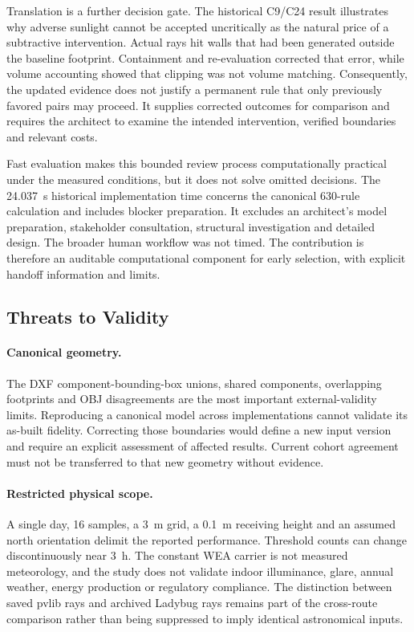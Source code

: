 \documentclass{llncs}
\begin{document}
Translation is a further decision gate. The historical C9/C24 result illustrates why adverse sunlight cannot be accepted uncritically as the natural price of a subtractive intervention. Actual rays hit walls that had been generated outside the baseline footprint. Containment and re-evaluation corrected that error, while volume accounting showed that clipping was not volume matching. Consequently, the updated evidence does not justify a permanent rule that only previously favored pairs may proceed. It supplies corrected outcomes for comparison and requires the architect to examine the intended intervention, verified boundaries and relevant costs.

Fast evaluation makes this bounded review process computationally practical under the measured conditions, but it does not solve omitted decisions. The 24.037~s historical implementation time concerns the canonical 630-rule calculation and includes blocker preparation. It excludes an architect's model preparation, stakeholder consultation, structural investigation and detailed design. The broader human workflow was not timed. The contribution is therefore an auditable computational component for early selection, with explicit handoff information and limits.

\subsection{Threats to Validity}
\paragraph{Canonical geometry.} The DXF component-bounding-box unions, shared components, overlapping footprints and OBJ disagreements are the most important external-validity limits. Reproducing a canonical model across implementations cannot validate its as-built fidelity. Correcting those boundaries would define a new input version and require an explicit assessment of affected results. Current cohort agreement must not be transferred to that new geometry without evidence.

\paragraph{Restricted physical scope.} A single day, 16 samples, a 3~m grid, a 0.1~m receiving height and an assumed north orientation delimit the reported performance. Threshold counts can change discontinuously near 3~h. The constant WEA carrier is not measured meteorology, and the study does not validate indoor illuminance, glare, annual weather, energy production or regulatory compliance. The distinction between saved pvlib rays and archived Ladybug rays remains part of the cross-route comparison rather than being suppressed to imply identical astronomical inputs.
\end{document}
